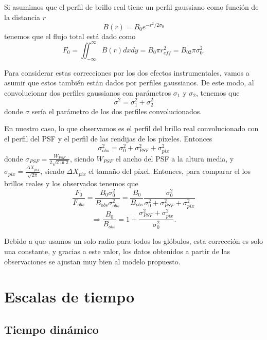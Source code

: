 \documentclass{book}
\begin{document}
Si asumimos que el perfil de brillo real tiene un perfil gaussiano como función de la distancia $r$ 
\begin{equation}
B(r)= B_0 e^{-r^2/2\sigma_0}
\end{equation} 
tenemos que el flujo total está dado como 
\begin{equation}
F_0=\iint_{-\infty}^\infty B(r)dxdy=B_0 \pi r_{eff}^2=B_02\pi \sigma_0^2.
\end{equation}

Para considerar estas correcciones por los dos efectos instrumentales, vamos a asumir que estos también están dados por perfiles gaussianos. De este modo, al convolucionar dos perfiles gaussianos con parámetros $\sigma_1$ y $\sigma_2$, tenemos que 
\begin{equation}
\sigma^2=\sigma_1^2+\sigma_2^2
\end{equation}
donde $\sigma$ sería el parámetro de los dos perfiles convolucionados.

En nuestro caso, lo que observamos es el perfil del brillo real convolucionado con el perfil del PSF y el perfil de las rendijas de los píxeles. Entonces 
\begin{equation}
\sigma_{obs}^2=\sigma_0^2+\sigma_{PSF}^2+\sigma_{pix}^2
\end{equation}
donde $\sigma_{PSF}=\frac{W_{PSF}}{2\sqrt{2\ln{2}}}$, siendo $W_{PSF}$ el ancho del PSF a la altura media, y $\sigma_{pix}=\frac{\Delta X_{pix}}{\sqrt{2\pi}}$, siendo $\Delta X_{pix}$ el tamaño del píxel. Entonces, para comparar el los brillos reales y los observados tenemos que
\begin{equation}
\frac{F_0}{F_{obs}}=\frac{B_0\sigma_0^2}{B_{obs}\sigma_{obs}^2}=\frac{B_0}{B_{obs}}\frac{\sigma_0^2}{\sigma_0^2+\sigma_{PSF}^2+\sigma_{pix}^2}
\end{equation} 
\begin{equation}
\Rightarrow \frac{B_0}{B_{obs}}=1+\frac{\sigma_{PSF}^2+\sigma_{pix}^2}{\sigma_0^2}.
\end{equation}

Debido a que usamos un solo radio para todos los glóbulos, esta corrección es solo una constante, y gracias a este valor, los datos obtenidos a partir de las observaciones se ajustan muy bien al modelo propuesto.


\chapter{Escalas de tiempo}

\section{Tiempo dinámico}
\end{document}
